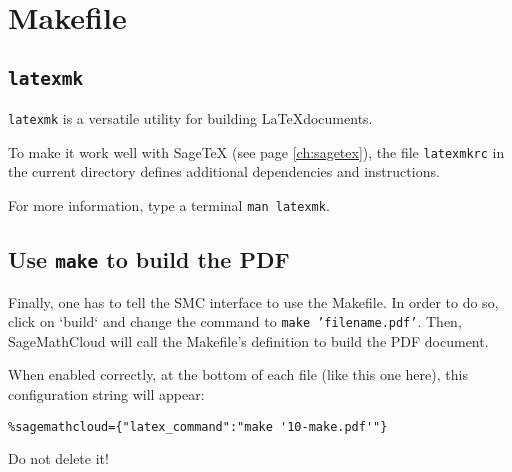 \documentclass[master.tex]{subfiles}
\begin{document}
\chapter{Makefile}

\section{\texttt{latexmk}}

\texttt{latexmk} is a versatile utility for building \LaTeX documents.

To make it work well with SageTeX (see page \ref{ch:sagetex}),
the file \texttt{latexmkrc} in the current directory defines
additional dependencies and instructions.

For more information, type a terminal \texttt{man latexmk}.

\section{Use \texttt{make} to build the PDF}

Finally, one has to tell the SMC interface to use the Makefile.
In order to do so, click on `build` and change the
command to \texttt{make 'filename.pdf'}.
Then, SageMathCloud will call the Makefile's definition to build the PDF document.

When enabled correctly, at the bottom of each file (like this one here),
this configuration string will appear:

\begin{verbatim}
%sagemathcloud={"latex_command":"make '10-make.pdf'"}
\end{verbatim}

Do not delete it!
\end{document}
